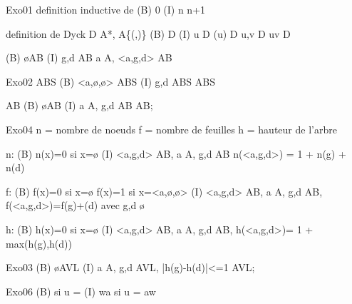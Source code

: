 Exo01
definition inductive de \N
(B) 0 \in \N
(I) n \in \N \rightarrow n+1 \in \N


definition de Dyck D \sebseteq A*, A\{(,)\}
(B) \varepsilon \in D
(I) 	u \in D \rightarrow (u) \in D
		u,v \in D \rightarrow uv \in D

(B) \o \in AB
(I) g,d \in AB \rightarrow \forall a \in A, <a,g,d> \in AB

Exo02
ABS
(B) <a,\o,\o> \in ABS
(I) g,d \in ABS  \in ABS

AB
(B) \o \in AB
(I) \forall a \in A, g,d \in AB 
	\rightarrow <a,g,d> \in AB;

Exo04
n = nombre de noeuds
f = nombre de feuilles
h = hauteur de l'arbre

n:
(B) n(x)=0 si x=\o
(I) <a,g,d> \in AB, a \in A, g,d \in AB 		\rightarrow n(<a,g,d>) = 1 + n(g) + n(d)

f:
(B) f(x)=0 si x=\o
	f(x)=1 si x=<a,\o,\o>
(I) <a,g,d> \in AB, a \in A, g,d \in AB,
	\rightarrow f(<a,g,d>)=f(g)+(d) avec g,d \ne \o

h:
(B) h(x)=0 si x=\o
(I) <a,g,d> \in AB, a \in A, g,d \in AB,
	\rightarrow h(<a,g,d>)= 1 + max(h(g),h(d))

Exo03
(B) \o \in AVL
(I) \forall a \in A, g,d \in AVL, 
	|h(g)-h(d)|<=1 
	\rightarrow <a,g,d> \in AVL;


Exo06
(B) \varepsilon si u = \varepsilon
(I) wa si u = aw